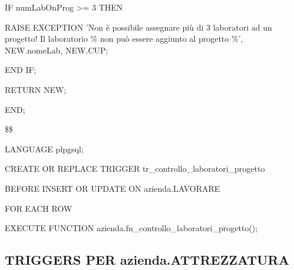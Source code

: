 \begin{flushleft}
\begin{description}
\begin{description}
                    \item IF numLabOnProg >= 3 THEN
                    \begin{description}
                        \item RAISE EXCEPTION 'Non è possibile assegnare più di 3 laboratori ad un progetto! Il laboratorio \% non può essere aggiunto al progetto \%', NEW.nomeLab, NEW.CUP;
                    \end{description}
                    \item END IF;

                    \item RETURN NEW;

                \end{description}

                \item END;
                \item \$\$
                \item LANGUAGE plpgsql;
            \end{description}
        \end{flushleft}
    \normalfont

    \ttfamily
        \begin{flushleft}
            \begin{description}
                \item CREATE OR REPLACE TRIGGER tr\_controllo\_laboratori\_progetto
                \item BEFORE INSERT OR UPDATE ON azienda.LAVORARE
                \item FOR EACH ROW
                \item EXECUTE FUNCTION azienda.fn\_controllo\_laboratori\_progetto();
            \end{description}
        \end{flushleft}
    \normalfont

\newpage

    \subsection{TRIGGERS PER azienda.ATTREZZATURA}

